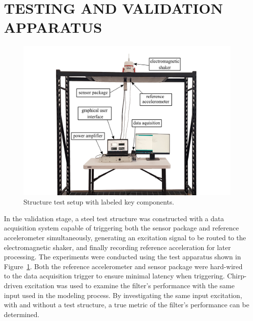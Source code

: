 \documentclass[]{spie}  %
\begin{document}
	
	\section{TESTING AND VALIDATION APPARATUS}
	


	\begin{figure} [H]
		\centering
		\includegraphics[width=6 in]{figures/structure experimental setup.png}
		\caption{Structure test setup with labeled key components.}
		\label{fig:structure experimental setup} 
	\end{figure}


	
	In the validation stage, a steel test structure was constructed with a data acquisition system capable of triggering both the sensor package and reference accelerometer simultaneously, generating an excitation signal to be routed to the electromagnetic shaker, and finally recording reference acceleration for later processing. The experiments were conducted using the test apparatus shown in Figure~\ref{fig:structure experimental setup}. Both the reference accelerometer and sensor package were hard-wired to the data acquisition trigger to ensure minimal latency when triggering. Chirp-driven excitation was used to examine the filter’s performance with the same input used in the modeling process. By investigating the same input excitation, with and without a test structure, a true metric of the filter’s performance can be determined.  
		
\end{document}
